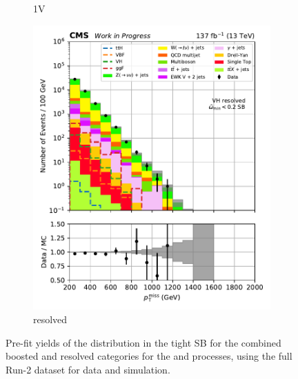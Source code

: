 \begin{figure}[htbp]
\begin{subfigure}[b]{0.24\textwidth}
        \caption{\VH 1V}
    \end{subfigure}
    \hfill
    \begin{subfigure}[b]{0.24\textwidth}
        \includegraphics[width=\textwidth]{figures/region_plots/2016to18/sideband_3/VH_resolved.pdf}
        \caption{\VH resolved}
    \end{subfigure}
    \caption[Pre-fit yields of the \ptmiss distribution in the tight \omegaTilde sideband for the combined boosted and resolved categories for the \ttH and \VH processes, using the full Run-2 dataset for data and simulation]{Pre-fit yields of the \ptmiss distribution in the tight \omegaTilde \gls{SB} for the combined boosted and resolved categories for the \ttH and \VH processes, using the full Run-2 dataset for data and simulation.}
    \label{fig:htoinv_sb_yields_comb2016to18_tight_minOmegaTilde}
\end{figure}

